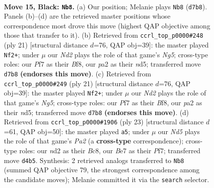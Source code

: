 \documentclass[11pt]{article}
\begin{document}
\clearpage

\begin{figure}[p]\centering
\begin{subfigure}{0.46\textwidth}\centering
\resizebox{\linewidth}{!}{%
\newchessgame
\chessboard[
  setfen={r1b1k2r/pp1nbppp/4p3/3pP3/3n1P2/3B2P1/P2N3P/R1B1K1NR b KQ - 0 15},
  showmover=false,
  pgfstyle=straightmove, color=movearrow, markmove={d7-b8}
]}
\caption{}
\end{subfigure}\hfill
\begin{subfigure}{0.46\textwidth}\centering
\resizebox{\linewidth}{!}{%
\newchessgame
\chessboard[
  setfen={rnb1kb1r/pp3ppp/8/3NP3/4P1n1/8/PP4PP/R1BK1BNR b kq - 2 11},
  showmover=false,
  pgfstyle=straightmove, color=movearrow, markmove={g4-f2}
]}
\caption{}
\end{subfigure}
\\[4pt]
\begin{subfigure}{0.46\textwidth}\centering
\resizebox{\linewidth}{!}{%
\newchessgame
\chessboard[
  setfen={rnb1kb1r/pp3ppp/8/3NP3/4P1n1/8/PP4PP/R1BK1BNR b kq - 2 11},
  showmover=false,
  pgfstyle=straightmove, color=movearrow, markmove={g4-f2}
]}
\caption{}
\end{subfigure}\hfill
\begin{subfigure}{0.46\textwidth}\centering
\resizebox{\linewidth}{!}{%
\newchessgame
\chessboard[
  setfen={r1b1kb1r/p1p2ppp/1p6/3Pp3/1n2P3/4BP2/PP1K2PP/R4BNR b kq - 1 12},
  showmover=false,
  pgfstyle=straightmove, color=movearrow, markmove={a7-a5}
]}
\caption{}
\end{subfigure}
\caption{\textbf{Move 15, Black: \texttt{Nb8}.} (a) Our position; Melanie plays \texttt{Nb8} (\texttt{d7b8}). Panels (b)--(d) are the retrieved master positions whose correspondence most drove this move (highest QAP objective among those that transfer to it). (b) Retrieved from \texttt{ccrl\_top\_p0000\#248} (ply 21) [structural distance $d$=76, QAP obj=39]: the master played \texttt{Nf2+}; under $\mu$ our \emph{Nd2} plays the role of that game's \emph{Ng5}; cross-type roles: our \emph{P}f7 as their \emph{B}f8, our \emph{p}a2 as their \emph{n}d5; transferred move \texttt{d7b8} \textbf{(endorses this move)}. (c) Retrieved from \texttt{ccrl\_top\_p0000\#249} (ply 21) [structural distance $d$=76, QAP obj=39]: the master played \texttt{Nf2+}; under $\mu$ our \emph{Nd2} plays the role of that game's \emph{Ng5}; cross-type roles: our \emph{P}f7 as their \emph{B}f8, our \emph{p}a2 as their \emph{n}d5; transferred move \texttt{d7b8} \textbf{(endorses this move)}. (d) Retrieved from \texttt{ccrl\_top\_p0000\#1906} (ply 23) [structural distance $d$=61, QAP obj=50]: the master played \texttt{a5}; under $\mu$ our \emph{Nd5} plays the role of that game's \emph{Pa2} (a \textbf{cross-type} correspondence); cross-type roles: our \emph{n}d2 as their \emph{B}c8, our \emph{B}e7 as their \emph{P}f7; transferred move \texttt{d4b5}. Synthesis: 2 retrieved analogs transferred to \texttt{Nb8} (summed QAP objective 79, the strongest correspondence among the candidate moves); Melanie committed it via the \texttt{search} selector.}
\label{fig:thought-m29}
\end{figure}
\end{document}
